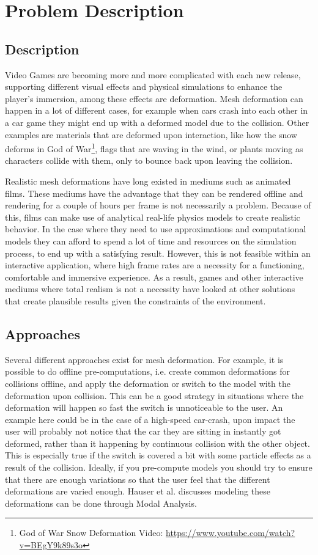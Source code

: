 \chapter{Problem Description}
\section{Description}
Video Games are becoming more and more complicated with each new release, supporting different visual effects and physical simulations
to enhance the player's immersion, among these effects are deformation. 
Mesh deformation can happen in a lot of different cases, for example when cars crash into each other in a car game they might end up with a deformed model due to the collision. 
Other examples are materials that are deformed upon interaction, like how the snow deforms in God of War\footnote{God of War Snow Deformation Video: \url{https://www.youtube.com/watch?v=BEgY9k89s3o}}, flags that are waving in the wind, or plants moving as characters collide with them, only to bounce back upon leaving the collision.

Realistic mesh deformations have long existed in mediums such as animated films.
These mediums have the advantage that they can be rendered offline and rendering for a couple of hours per frame is not necessarily a problem. 
Because of this, films can make use of analytical real-life physics models to create realistic behavior.
In the case where they need to use approximations and computational models they can afford to spend a lot of time and resources on
the simulation process, to end up with a satisfying result.
However, this is not feasible within an interactive application, where high frame rates are a necessity for a functioning,
comfortable and immersive experience. As a result, games and other interactive mediums where total realism is not a necessity
have looked at other solutions that create plausible results given the constraints of the environment.

\section{Approaches}
Several different approaches exist for mesh deformation.
For example, it is possible to do offline pre-computations, i.e. create common deformations for collisions offline, and apply the deformation or switch to the model with the deformation upon collision. 
This can be a good strategy in situations where the deformation will happen so fast the switch is unnoticeable to the user.
An example here could be in the case of a high-speed car-crash, upon impact the user will probably not notice that the car they are sitting in instantly got deformed,
rather than it happening by continuous collision with the other object. This is especially true if the switch is covered a bit with some particle effects as a result of the collision.
Ideally, if you pre-compute models you should try to ensure that there are enough variations so that the user feel that the different deformations are varied enough.
Hauser et al.\cite{hauser2003interactive} discusses modeling these deformations can be done through Modal Analysis.

